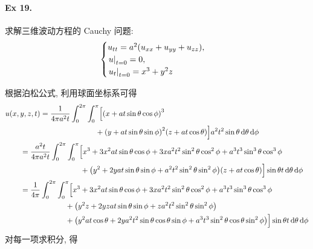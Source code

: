 \paragraph{Ex 19.}
求解三维波动方程的 Cauchy 问题:
\[ \begin{cases}
u_{tt} = a^2 (u_{xx} + u_{yy} + u_{zz}), \\
{\left.{u} \right|}_{t=0} = 0, \\
{\left.{u_t} \right|}_{t=0} = x^3 + y^2 z
\end{cases} \]

\solution
根据泊松公式, 利用球面坐标系可得
\[ \begin{aligned}
&u(x, y, z, t) =
\frac{1}{4\pi a^2 t} \int_0^{2\pi} \int_0^\pi \Bigl[
	\mclosure{x + at\sin\theta \cos\phi}^3 \\
	&\hspace{12em}+\mclosure{y + at\sin\theta \sin\phi}^2 \mclosure{z + at\cos\theta}
\Bigr] a^2 t^2 \sin\theta \diff\theta \diff\phi\\
&\hspace{2em}=\frac{a^2 t}{4\pi a^2 t} \int_0^{2\pi} \int_0^\pi \Bigl[
	x^3 + 3x^2 at\sin\theta \cos\phi + 3x a^2t^2\sin^2\theta \cos^2\phi
	+a^3t^3\sin^3\theta \cos^3\phi \\
	&\hspace{10em}+\mclosure{y^2 + 2yat\sin\theta \sin\phi + a^2t^2\sin^2\theta \sin^2\phi}
	\mclosure{z + at\cos\theta}
\Bigr] \sin\theta t \diff\theta \diff\phi \\
&\hspace{2em}=\frac{1}{4\pi} \int_0^{2\pi} \int_0^\pi \Bigl[
	x^3 + 3x^2 at\sin\theta \cos\phi + 3x a^2t^2\sin^2\theta \cos^2\phi
	+a^3t^3\sin^3\theta \cos^3\phi \\
	&\hspace{8em}+\mclosure{
		y^2z + 2yzat\sin\theta \sin\phi + za^2t^2\sin^2\theta \sin^2\phi
	} \\
	&\hspace{8em}+\mclosure{
		y^2at\cos\theta
		+ 2ya^2t^2\sin\theta \cos\theta \sin\phi
		+ a^3t^3\sin^2\theta \cos\theta \sin^2\phi
	}
\Bigr] \sin\theta t \diff\theta \diff\phi \\
\end{aligned} \]
对每一项求积分, 得
